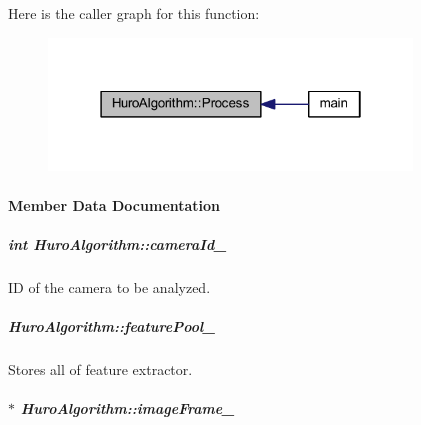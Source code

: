 Here is the caller graph for this function\-:
\nopagebreak
\begin{figure}[H]
\begin{center}
\leavevmode
\includegraphics[width=274pt]{group___object_recognition_ac2e91407459c4ebac0b33f7e7570022d_icgraph}
\end{center}
\end{figure}




\paragraph{Member Data Documentation}
\hypertarget{group___object_recognition_ab1c035063117de9d0b865066d877e11a}{
\subparagraph[{camera\-Id\-\_\-}]{\setlength{\rightskip}{0pt plus 5cm}int Huro\-Algorithm\-::camera\-Id\-\_\-\hspace{0.3cm}{\ttfamily [private]}}}\label{group___object_recognition_ab1c035063117de9d0b865066d877e11a}


I\-D of the camera to be analyzed. 

\hypertarget{group___object_recognition_a5408d8b09ff99592e7e0d196357e0f05}{
\subparagraph[{feature\-Pool\-\_\-}]{ Huro\-Algorithm\-::feature\-Pool\-\_\-\hspace{0.3cm}{\ttfamily [private]}}}\label{group___object_recognition_a5408d8b09ff99592e7e0d196357e0f05}


Stores all of feature extractor. 

\hypertarget{group___object_recognition_ae03bda7ba79c469b7f36566fe354f93a}{
\subparagraph[{image\-Frame\-\_\-}]{$\ast$ Huro\-Algorithm\-::image\-Frame\-\_\-\hspace{0.3cm}{\ttfamily [private]}}}\label{group___object_recognition_ae03bda7ba79c469b7f36566fe354f93a}



